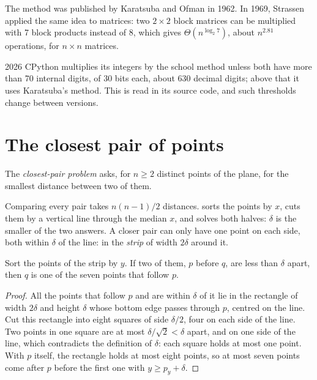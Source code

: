 \begin{history}
The method was published by Karatsuba and Ofman in 1962. In 1969, Strassen applied the same idea to matrices: two $2
\times 2$ block matrices can be multiplied with 7 block products instead of 8, which gives $\Theta(n^{\log_2 7})$,
about $n^{2.81}$ operations, for $n \times n$ matrices.
\end{history}

\begin{dated}{2026}
CPython multiplies its integers by the school method unless both have more than 70 internal digits, of 30 bits each,
about 630 decimal digits; above that it uses Karatsuba's method. This is read in its source code, and such thresholds
change between versions.
\end{dated}

\section{The closest pair of points}\label{sec:b1:divide-and-conquer:closest}

\begin{definition}\label{def:b1:divide-and-conquer:closest}
The \emph{closest-pair problem} asks, for $n \geq 2$ distinct points of the plane, for the
smallest distance between two of them.
\end{definition}

Comparing every pair takes $n(n - 1)/2$ distances.  sorts the points by $x$, cuts them by a vertical
line through the median $x$, and solves both halves: $\delta$ is the smaller of the two answers. A closer pair can only
have one point on each side, both within $\delta$ of the line: in the \emph{strip} of width $2\delta$ around it.

\begin{proposition}\label{prop:b1:divide-and-conquer:seven}
Sort the points of the strip by $y$. If two of them, $p$ before $q$, are less than $\delta$ apart, then $q$ is one of
the seven points that follow $p$.
\end{proposition}

\begin{proof}
All the points that follow $p$ and are within $\delta$ of it lie in the rectangle of width $2\delta$ and height $\delta$
whose bottom edge passes through $p$, centred on the line. Cut this rectangle into eight squares of side $\delta/2$,
four on each side of the line. Two points in one square are at most $\delta/\sqrt{2} < \delta$ apart, and on one side
of the line, which contradicts the definition of $\delta$: each square holds at most one point. With $p$ itself, the
rectangle holds at most eight points, so at most seven points come after $p$ before the first one with $y \geq p_y +
\delta$.
\end{proof}

